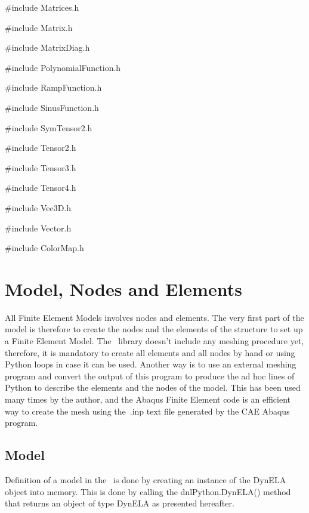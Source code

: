 \#include \textquotedbl Matrices.h\textquotedbl{}

\#include \textquotedbl Matrix.h\textquotedbl{}

\#include \textquotedbl MatrixDiag.h\textquotedbl{}

\#include \textquotedbl PolynomialFunction.h\textquotedbl{}

\#include \textquotedbl RampFunction.h\textquotedbl{}

\#include \textquotedbl SinusFunction.h\textquotedbl{}

\#include \textquotedbl SymTensor2.h\textquotedbl{}

\#include \textquotedbl Tensor2.h\textquotedbl{}

\#include \textquotedbl Tensor3.h\textquotedbl{}

\#include \textquotedbl Tensor4.h\textquotedbl{}

\#include \textquotedbl Vec3D.h\textquotedbl{}

\#include \textquotedbl Vector.h\textquotedbl{}

\#include \textquotedbl ColorMap.h\textquotedbl{}

\section{Model, Nodes and Elements}

All Finite Element Models involves nodes and elements. The very first part of the model is therefore to create the nodes and the elements of the structure to set up a Finite Element Model. The \DynELA~library doesn't include any meshing procedure yet, therefore, it is mandatory to create all elements and all nodes by hand or using Python loops in case it can be used. Another way is to use an external meshing program and convert the output of this program to produce the ad hoc lines of Python to describe the elements and the nodes of the model. This has been used many times by the author, and the Abaqus Finite Element code is an efficient way to create the mesh using the \textsf{.inp} text file generated by the CAE Abaqus program.

\subsection{Model}

Definition of a model in the \DynELA~is done by creating an instance of the \textsf{DynELA} object into memory. This is done by calling the \textsf{dnlPython.DynELA()} method that returns an object of type \textsf{DynELA} as presented hereafter.

